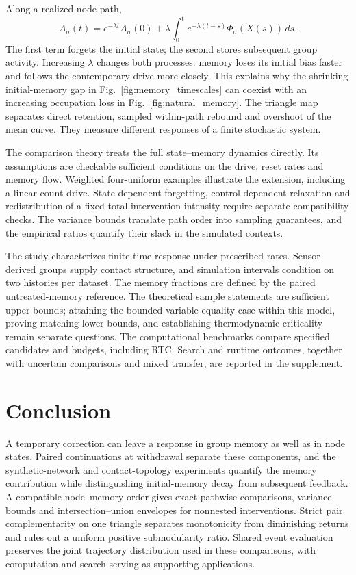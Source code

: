 \documentclass[final,5p,times,twocolumn,sort&compress]{elsarticle}
\theoremstyle{plain}
\begin{document}
Along a realized node path,
\[
 A_\sigma(t)=e^{-\lambda t}A_\sigma(0)
 +\lambda\int_0^t e^{-\lambda(t-s)}\Phi_\sigma(X(s))\,ds.
\]
The first term forgets the initial state; the second stores subsequent group activity. Increasing $\lambda$ changes both processes: memory loses its initial bias faster and follows the contemporary drive more closely. This explains why the shrinking initial-memory gap in Fig.~\ref{fig:memory_timescales} can coexist with an increasing occupation loss in Fig.~\ref{fig:natural_memory}. The triangle map separates direct retention, sampled within-path rebound and overshoot of the mean curve. They measure different responses of a finite stochastic system.

The comparison theory treats the full state--memory dynamics directly. Its assumptions are checkable sufficient conditions on the drive, reset rates and memory flow. Weighted four-uniform examples illustrate the extension, including a linear count drive. State-dependent forgetting, control-dependent relaxation and redistribution of a fixed total intervention intensity require separate compatibility checks. The variance bounds translate path order into sampling guarantees, and the empirical ratios quantify their slack in the simulated contexts.

The study characterizes finite-time response under prescribed rates. Sensor-derived groups supply contact structure, and simulation intervals condition on two histories per dataset. The memory fractions are defined by the paired untreated-memory reference. The theoretical sample statements are sufficient upper bounds; attaining the bounded-variable equality case within this model, proving matching lower bounds, and establishing thermodynamic criticality remain separate questions. The computational benchmarks compare specified candidates and budgets, including RTC. Search and runtime outcomes, together with uncertain comparisons and mixed transfer, are reported in the supplement.

\section{Conclusion}
A temporary correction can leave a response in group memory as well as in node states. Paired continuations at withdrawal separate these components, and the synthetic-network and contact-topology experiments quantify the memory contribution while distinguishing initial-memory decay from subsequent feedback. A compatible node--memory order gives exact pathwise comparisons, variance bounds and intersection--union envelopes for nonnested interventions. Strict pair complementarity on one triangle separates monotonicity from diminishing returns and rules out a uniform positive submodularity ratio. Shared event evaluation preserves the joint trajectory distribution used in these comparisons, with computation and search serving as supporting applications.
\end{document}
